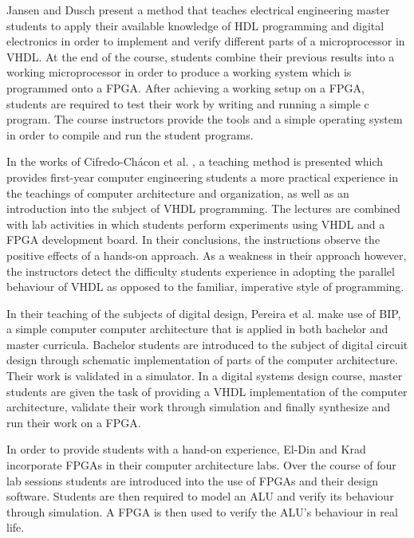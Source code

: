 \documentclass[openright]{uva-bachelor-thesis}
\begin{document}

Jansen and Dusch \cite{jansen2014every} present a method that teaches electrical engineering master students to apply their available knowledge of HDL programming and digital electronics in order to implement and verify different parts of a microprocessor in VHDL. At the end of the course, students combine their previous results into a working microprocessor in order to produce a working system which is programmed onto a FPGA. After achieving a working setup on a FPGA, students are required to test their work by writing and running a simple c program. The course instructors provide the tools and a simple operating system in order to compile and run the student programs. 

In the works of Cifredo-Ch\'acon et al. \cite{cifredo2015computer}, a teaching method is presented which provides first-year computer engineering students a more practical experience in the teachings of computer architecture and organization, as well as an introduction into the subject of VHDL programming. The lectures are combined with lab activities in which students perform experiments using VHDL and a FPGA development board. 
In their conclusions, the instructions observe the positive effects of a hands-on approach. As a weakness in their approach however, the instructors detect the difficulty students experience in adopting the parallel behaviour of VHDL as opposed to the familiar, imperative style of programming. 

In their teaching of the subjects of digital design, Pereira et al. \cite{pereira2012basic} make use of BIP, a simple computer computer architecture that is applied in both bachelor and master curricula. Bachelor students are introduced to the subject of digital circuit design through schematic implementation of parts of the computer architecture. Their work is validated in a simulator. In a digital systems design course, master students are given the task of providing a VHDL implementation of the computer architecture, validate their work through simulation and finally synthesize and run their work on a FPGA. 

In order to provide students with a hand-on experience, El-Din and Krad \cite{el2011teaching} incorporate FPGAs in their computer architecture labs. Over the course of four lab sessions students are introduced into the use of FPGAs and their design software. Students are then required to model an ALU and verify its behaviour through simulation. A FPGA is then used to verify the ALU's behaviour in real life. 
\end{document}
